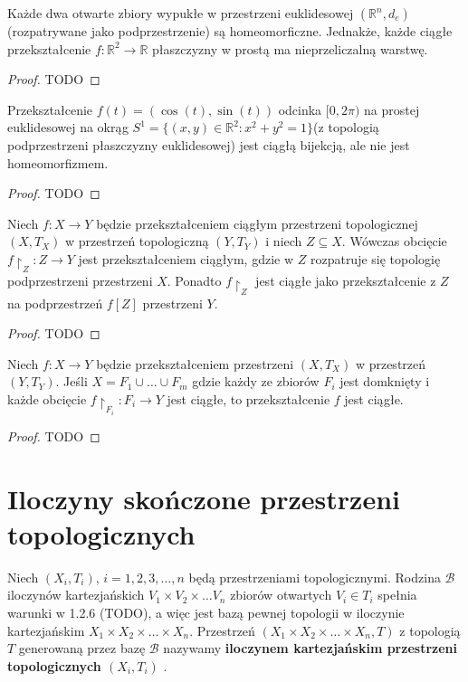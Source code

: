 \begin{eg}[1.3.8 A]
	Każde dwa otwarte zbiory wypukłe w przestrzeni euklidesowej $\left( \mathbb{R}^{n},d_{e} \right) $ (rozpatrywane jako podprzestrzenie) są homeomorficzne. Jednakże, każde ciągłe przekształcenie $f: \mathbb{R}^2 \to \mathbb{R} $ płaszczyzny w prostą ma nieprzeliczalną warstwę.
\end{eg} 
\begin{proof}
	TODO
\end{proof} 
\begin{eg}[1.3.8 B]
	Przekształcenie $f\left( t \right) = \left( \cos\left( t \right) , \sin\left( t \right) \right) $ odcinka $[0, 2\pi)$ na prostej euklidesowej na okrąg $S^{1} = \{\left( x,y \right) \in \mathbb{R}^2: x^2 + y^2 = 1\} $(z topologią podprzestrzeni płaszczyzny euklidesowej) jest ciągłą bijekcją, ale nie jest homeomorfizmem.
\end{eg} 
\begin{proof}
	TODO
\end{proof} 
\begin{remark}[1.3.9 A]
	Niech $f: X \to Y$ będzie przekształceniem ciągłym przestrzeni topologicznej $\left( X,T_{X} \right) $ w przestrzeń topologiczną $\left( Y,T_{Y} \right) $ i niech $Z \subseteq X$. Wówczas obcięcie $f\restriction_{Z} : Z \to Y$ jest przekształceniem ciągłym, gdzie w $Z$ rozpatruje się topologię podprzestrzeni przestrzeni $X$. Ponadto $f\restriction_{Z} $ jest ciągłe jako przekształcenie z $Z$ na podprzestrzeń  $f\left[ Z \right] $ przestrzeni $Y$.
\end{remark} 
\begin{proof}
	TODO
\end{proof} 
\begin{remark}[1.3.9 B]
	Niech $f: X \to Y$ będzie przekształceniem przestrzeni $\left( X, T_{X} \right) $ w przestrzeń $\left( Y, T_{Y} \right) $. Jeśli $X = F_1 \cup \ldots \cup F_{m}$ gdzie każdy ze zbiorów $F_{i}$ jest domknięty i każde obcięcie $f\restriction_{F_{i}} : F_{i} \to Y$ jest ciągłe, to przekształcenie $f$ jest ciągłe.
\end{remark} 
\begin{proof}
	TODO
\end{proof} 
\section{Iloczyny skończone przestrzeni topologicznych}

\begin{definition}
	Niech $\left( X_{i}, T_{i} \right) $, $i = 1,2,3,\ldots, n$ będą przestrzeniami topologicznymi. Rodzina $\mathcal{B}$ iloczynów kartezjańskich $V_1\times V_2\times \ldots V_{n} $ zbiorów otwartych $V_{i}\in T_{i}$ spełnia warunki w 1.2.6 (TODO), a więc jest bazą pewnej topologii w iloczynie kartezjańskim $X_1\times X_2\times \ldots \times X_{n} $. Przestrzeń $\left( X_1\times X_2\times \ldots \times X_{n}, T  \right) $ z topologią $T$ generowaną przez bazę $\mathcal{B}$ nazywamy \textbf{iloczynem kartezjańskim przestrzeni topologicznych $\left( X_{i},T_{i} \right) $} .
	
\end{definition} 

